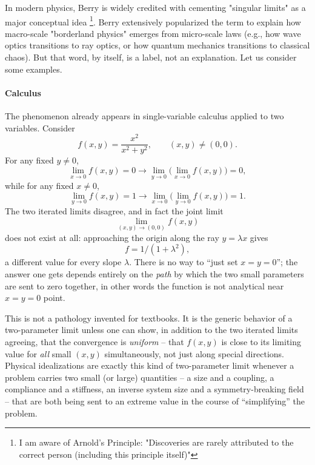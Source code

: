In modern physics, Berry is widely credited with cementing "singular limits" as
a major conceptual idea \footnote{I am aware of Arnold's Principle:
"Discoveries are rarely attributed to the correct person (including this
principle itself)"}. Berry extensively popularized the term to explain how
macro-scale "borderland physics" emerges from micro-scale laws (e.g., how wave
optics transitions to ray optics, or how quantum mechanics transitions to
classical chaos). But that word, by itself, is a label, not an explanation. Let
us consider some examples.

\paragraph{Calculus}
The phenomenon  already appears in
single-variable calculus applied to two variables. Consider
\begin{equation}
f(x,y) = \frac{x^2}{x^2+y^2}, \qquad (x,y)\neq(0,0).
\end{equation}
For any fixed $y\neq0$,
\begin{equation}
\lim_{x\to0}f(x,y)=0\longrightarrow\lim_{y\to0}\Big(\lim_{x\to0}f(x,y)\Big)=0,
\end{equation}
while for any fixed $x\neq0$,
\begin{equation}
\lim_{y\to0}f(x,y)=1\longrightarrow\lim_{x\to0}\Big(\lim_{y\to0}f(x,y)\Big)=1.
\end{equation}
The two iterated limits disagree, and in fact the joint limit
\[\lim_{(x,y)\to(0,0)}f(x,y)\]
does not exist at all: approaching
the origin along the ray $y=\lambda x$ gives 
\[f =1/(1+\lambda^2),\]
a different value for every slope $\lambda$.
There is no way to ``just set $x=y=0$''; the answer one gets
depends entirely on the \emph{path} by which the two small
parameters are sent to zero together, in other words the 
function is not analytical near $x=y=0$ point.

This is not a pathology invented for textbooks. It is the
generic behavior of a two-parameter limit unless one can show,
in addition to the two iterated limits agreeing, that the
convergence is \emph{uniform} -- that $f(x,y)$ is close to its
limiting value for \emph{all} small $(x,y)$ simultaneously, not
just along special directions. Physical idealizations are
exactly this kind of two-parameter limit whenever a problem
carries two small (or large) quantities -- a size and a
coupling, a compliance and a stiffness, an inverse system size
and a symmetry-breaking field -- that are both being sent to an
extreme value in the course of ``simplifying'' the problem.

